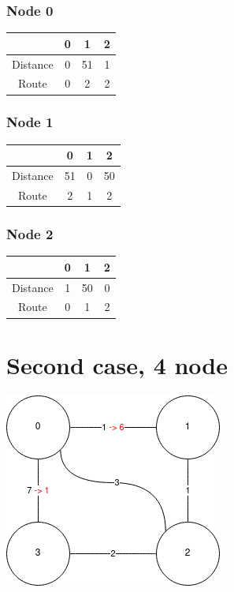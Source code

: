 \documentclass[a4paper,11pt,final]{report}
\begin{document}
\subsubsection{Node 0}

\begin{tabular}{|c|c|c|c|}
\hline
& 0 & 1 & 2 \\ \hline
Distance & 0 & 51 & 1 \\ \hline
Route & 0 & 2 & 2 \\ \hline
\end{tabular}

\subsubsection{Node 1}

\begin{tabular}{|c|c|c|c|}
\hline
& 0 & 1 & 2 \\ \hline
Distance & 51 & 0 & 50 \\ \hline
Route & 2 & 1 & 2 \\ \hline
\end{tabular}

\subsubsection{Node 2}

\begin{tabular}{|c|c|c|c|}
\hline
& 0 & 1 & 2 \\ \hline
Distance & 1 & 50 & 0 \\ \hline
Route & 0 & 1 & 2 \\ \hline
\end{tabular}

\section{Second case, 4 node}

\includegraphics{upload_d59fdf12fdb78f269782a82e8e2dfa44.png}
\end{document}
